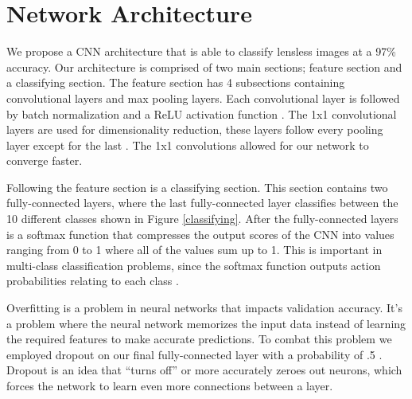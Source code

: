 \documentclass{osa-article}
\begin{document}
\section{Network Architecture}
We propose a CNN architecture that is able to classify lensless images at a 97\% accuracy. Our architecture is comprised of two main sections; feature section and a classifying section. The feature section has 4 subsections containing convolutional layers and max pooling layers. Each convolutional layer is followed by batch normalization and a ReLU activation function \cite{DBLP:journals/corr/IoffeS15, Nair:2010:RLU:3104322.3104425}.
%
 The 1x1 convolutional layers are used for dimensionality reduction, these layers follow every pooling layer except for the last \cite{DBLP:journals/corr/LinCY13}. The 1x1 convolutions allowed for our network to converge faster. \par
Following the feature section is a classifying section. This section contains two fully-connected layers, where the last fully-connected layer classifies between the 10 different classes shown in Figure \ref{classifying}. After the fully-connected layers is a softmax function that compresses the output scores of the CNN into values ranging from 0 to 1 where all of the values sum up to 1. This is important in multi-class classification problems, since the softmax function outputs action probabilities relating to each class  \cite{Bishop:2006:PRM:1162264, Sutton:1998:IRL:551283}. \par
Overfitting is a problem in neural networks that impacts validation accuracy. It's a problem where the neural network memorizes the input data instead of learning the required features to make accurate predictions. To combat this problem we employed dropout on our final fully-connected layer with a probability of .5 \cite{JMLR:v15:srivastava14a}. Dropout is an idea that ``turns off'' or more accurately zeroes out neurons, which forces the network to learn even more connections between a layer.
%
\end{document}
